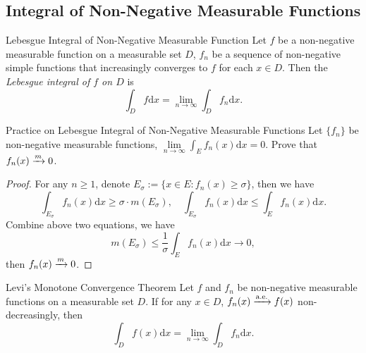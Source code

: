 \subsection{Integral of Non-Negative Measurable Functions}

\begin{definition}{Lebesgue Integral of Non-Negative Measurable Function}{}
  Let $f$ be a non-negative measurable function on a measurable set $D$,
  $f_n$ be a sequence of non-negative simple functions that increasingly
  converges to $f$ for each $x \in D$.
  Then the \emph{Lebesgue integral of $f$ on $D$} is
  \begin{equation}
    \int_D f \mathrm{d} x= \lim \limits _{n \rightarrow \infty} \int_D f_n \mathrm{d} x.
  \end{equation}
\end{definition}

\begin{example}{Practice on Lebesgue Integral of Non-Negative Measurable Functions}{}
  Let $\{f_n\}$ be non-negative measurable functions,
  $\lim \limits _{n \rightarrow \infty} \int_E f_n(x)\mathrm{d} x = 0$.
  Prove that $f_n(x) \xrightarrow{m} 0$.
\end{example}

\begin{proof}
  For any $n \geq 1$,
  denote $E_{\sigma} := \{x \in E: f_n(x) \geq \sigma\}$, then we have
  \begin{equation}
    \int_{E_{\sigma}}f_n(x)\mathrm{d} x \geq \sigma \cdot m (E_{\sigma}), \quad
    \int_{E_{\sigma}}f_n(x) \mathrm{d} x \leq \int_E f_n(x) \mathrm{d} x.
  \end{equation}
  Combine above two equations, we have
  \begin{equation}
    m(E_{\sigma}) \leq \frac{1}{\sigma} \int_E f_n(x)\mathrm{d} x \rightarrow 0,
  \end{equation}
  then $f_n(x) \xrightarrow{m} 0$.
\end{proof}

\begin{theorem}{Levi's Monotone Convergence Theorem}{}
  Let $f$ and $f_n$ be non-negative measurable functions on a measurable set
  $D$.
  If for any $x \in D$, $f_n(x) \xrightarrow{\text{a.e.}} f(x)$ non-decreasingly, then
  \begin{equation}
    \int_D f(x)\mathrm{d} x = \lim \limits _{n \rightarrow \infty} \int_D f_n\mathrm{d} x.
  \end{equation}
\end{theorem}

